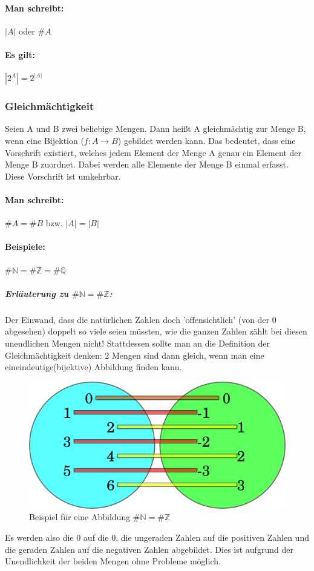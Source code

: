 \documentclass[a4paper,12pt, DIV12]{scrartcl}
\begin{document}
\paragraph{Man schreibt:}
\({}|{}A{}|{}\) oder \(\#A\)
\paragraph{Es gilt:}
\begin{math}
{}|{}2^A{}|{} = 2^{{}|{}A{}|{}}
\end{math}
\subsubsection*{Gleichmächtigkeit}
Seien A und B zwei beliebige Mengen.
Dann heißt A gleichmächtig zur Menge B, wenn eine Bijektion (\({f:A}\rightarrow{B}\)) gebildet
werden kann. Das bedeutet, dass eine Vorschrift existiert, welches
jedem Element der Menge A genau ein Element der Menge B zuordnet.
Dabei werden alle Elemente der Menge B einmal erfasst. Diese
Vorschrift ist umkehrbar.
\paragraph{Man schreibt:} \(\#A = \#B\) bzw. \(|A| = |B|\)
\paragraph*{Beispiele:}
\begin{math}
\#{\mathbb N} = \#{\mathbb Z} = \#{\mathbb Q}
\end{math}
\subparagraph{Erläuterung zu \(\#{\mathbb N} = \#{\mathbb Z}\):}
Der Einwand, dass die natürlichen Zahlen doch 'offensichtlich' (von der 0 abgesehen) doppelt so viele seien müssten, wie die ganzen Zahlen zählt bei diesen unendlichen Mengen nicht!
Stattdessen sollte man an die Definition der Gleichmächtigkeit denken: 2 Mengen sind dann gleich, wenn man eine eineindeutige(bijektive) Abbildung finden kann.
\begin{figure}[b]
  \centering
  \caption{Beispiel für eine Abbildung \(\#{\mathbb N} = \#{\mathbb Z}\)}
  \includegraphics[scale=0.5]{ngleichz.png}
\end{figure}
Es werden also die 0 auf die 0, die ungeraden Zahlen auf die positiven Zahlen und die geraden Zahlen auf die negativen Zahlen abgebildet. Dies ist aufgrund der Unendlichkeit der beiden Mengen ohne Probleme möglich.
\end{document}
